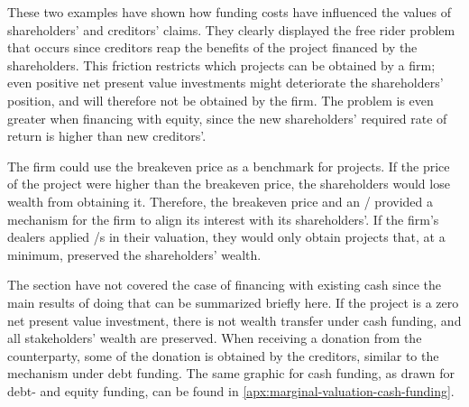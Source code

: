 \documentclass[main.tex]{subfiles}
\begin{document}
    These two examples have shown how funding costs have influenced 
    the values of shareholders' and creditors' claims.
    They clearly displayed the free rider problem that occurs
    since creditors reap the benefits of the project financed by the shareholders.
    This friction restricts which projects can be obtained by a firm;
    even positive net present value investments might deteriorate the shareholders' position,
    and will therefore not be obtained by the firm.
    The problem is even greater when financing with equity, 
    since the new shareholders' required rate of return is higher than new creditors'.
   
    The firm could use the breakeven price as a benchmark for projects. 
    If the price of the project were higher than the breakeven price, 
    the shareholders would lose wealth from obtaining it.
    Therefore, the breakeven price and an \FVA/ provided a mechanism for the firm
    to align its interest with its shareholders'.
    If the firm's dealers applied \FVA/s in their valuation,
    they would only obtain projects that, at a minimum, preserved the shareholders' wealth.
    
    The section have not covered the case of financing with existing cash
    since the main results of doing that can be summarized briefly here.
    If the project is a zero net present value investment, 
    there is not wealth transfer under cash funding,
    and all stakeholders' wealth are preserved.
    When receiving a donation from the counterparty, 
    some of the donation is obtained by the creditors, similar to the mechanism under debt funding.
    The same graphic for cash funding, as drawn for debt- and equity funding, can be found in 
    \cref{apx:marginal-valuation-cash-funding}.
\end{document}
